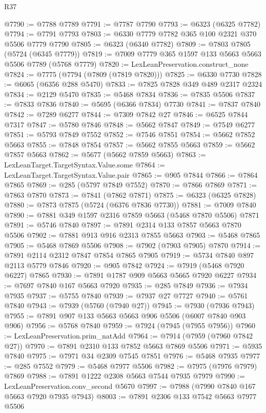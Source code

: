 \begin{lexlean}{R37}
\begin{coremodule}
@7790 := @7788 @7789
@7791 := @7787 @7790
@7793 := @6323 (@6325 @7782)
@7794 := @7791 @7793
@7803 := @6330 @7779 @7782 @365 @100 @2321 @370 @5506 @7779 @7790
@7805 := @6323 (@6340 @7782)
@7809 := @7803 @7805 (@5724 (@6345 @7779))
@7819 := @7009 @7779 @365 @1597 @133 @5663 @5663 @5506 @7789 (@5768 @7779)
@7820 := LexLeanPreservation.construct_none
@7824 := @7775 (@7794 (@7809 (@7819 @7820)))
@7825 := @6330 @7730
@7828 := @6065 (@6356 @288 @5470)
@7833 := @7825 @7828 @349 @489 @2317 @2324
@7834 := @2129 @5470
@7835 := @5468 @7834
@7836 := @7835 @5506
@7837 := @7833 @7836
@7840 := @5695 (@6366 @7834) @7730
@7841 := @7837 @7840
@7842 := @7289 @6277
@7844 := @7309 @7842 @27
@7846 := @6525 @7844 @7317
@7847 := @5780 @7846
@7848 := @5662 @7847
@7849 := @7549 @6277
@7851 := @5793 @7849 @7552
@7852 := @7546 @7851
@7854 := @5662 @7852 @5663
@7855 := @7848 @7854
@7857 := @5662 @7855 @5663
@7859 := @5662 @7857 @5663
@7862 := @5677 (@5662 @7859 @5663)
@7863 := LexLeanTarget.TargetSyntax.Value.some
@7864 := LexLeanTarget.TargetSyntax.Value.pair
@7865 := @905 @7844
@7866 := @7864 @7865
@7869 := @285 (@5797 @7849 @7552)
@7870 := @7866 @7869
@7871 := @7863 @7870
@7873 := @7841 (@7862 @7871)
@7875 := @6323 (@6325 @7828)
@7880 := @7873 @7875 (@5724 (@6376 @7836 @7730))
@7881 := @7009 @7840
@7890 := @7881 @349 @1597 @2316 @7859 @5663 (@5468 @7870 @5506) @7871
@7891 := @5746 @7840
@7897 := @7891 @2314 @133 @7857 @5663 @7870 @5506
@7902 := @7881 @913 @916 @2313 @7855 @5663
@7903 := @5468 @7865
@7905 := @5468 @7869 @5506
@7908 := @7902 (@7903 @7905) @7870
@7914 := @7891 @2114 @2312 @7847 @7854 @7865 @7905
@7919 := @5734 @7840 @897 @2113 @5779 @7846
@7920 := @905 @7842
@7924 := @7919 (@5468 @7920 @6227) @7865
@7930 := @7891 @1787 @909 @5663 @5665 @7920 @6227
@7934 := @7697 @7840 @167 @5663 @7920
@7935 := @285 @7849
@7936 := @7934 @7935
@7937 := @5755 @7840
@7939 := @7937 @27 @7727
@7940 := @5761 @7840
@7943 := @7939 (@5760 (@7940 @27))
@7945 := @7930 (@7936 @7943)
@7955 := @7891 @907 @133 @5663 @5663 @906 @5506 (@6007 @7840 @903 @906)
@7956 := @5768 @7840
@7959 := @7924 (@7945 (@7955 @7956))
@7960 := LexLeanPreservation.prim_natAdd
@7964 := @7914 (@7959 (@7960 @7842 @27))
@7970 := @7891 @2310 @133 @7852 @5663 @7869 @5506
@7971 := @5935 @7840
@7975 := @7971 @34 @2309 @7545 @7851
@7976 := @5468 @7935
@7977 := @285 @7552
@7979 := @5468 @7977 @5506
@7982 := @7975 (@7976 @7979) @7869
@7988 := @7891 @1222 @2308 @5663 @7544 @7935 @7979
@7990 := LexLeanPreservation.conv_second @5670
@7997 := @7988 (@7990 @7840 @167 @5663 @7920 @7935 @7943)
@8003 := @7891 @2306 @133 @7542 @5663 @7977 @5506

\end{coremodule}
\end{lexlean}
